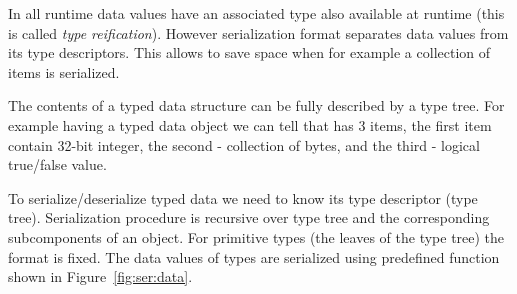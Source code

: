 In \langname all runtime data values have an associated type also available
at runtime (this is called \emph{type reification}\cite{Reification}).
However serialization format separates data values from its type descriptors. 
This allows to save space when for example a collection of items is serialized.

The contents of a typed data structure can be fully described by a type tree.
For example having a typed data object  we can
tell that  has 3 items, the first item contain 32-bit integer, the second
- collection of bytes, and the third - logical true/false value.

To serialize/deserialize typed data we need to know its type descriptor (type
tree). Serialization procedure is recursive over type tree and the
corresponding subcomponents of an object. For primitive types (the leaves of
the type tree) the format is fixed. The data values of \langname types are
serialized using predefined function shown in Figure~\ref{fig:ser:data}.

